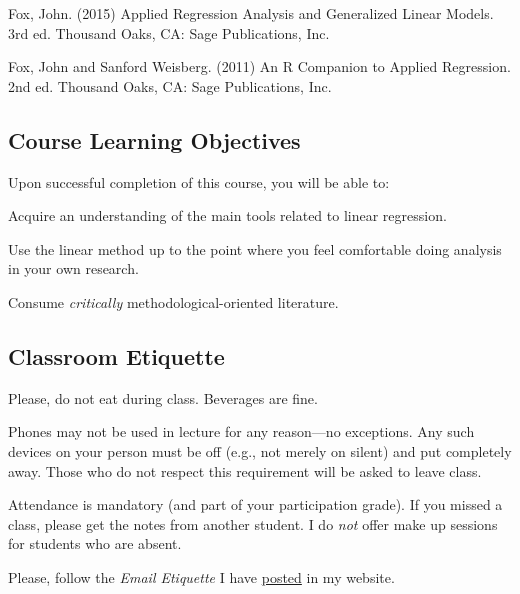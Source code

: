 \documentclass[letterpaper]{article}
\renewenvironment{itemize}{
  \begin{list}{}{
    \setlength{\leftmargin}{1.5em}
  }
}{
  \end{list}
}
\begin{document}
\begin{itemize}
	\item[$\bullet$] Fox, John. (2015) Applied Regression Analysis and Generalized Linear Models. 3rd ed. Thousand Oaks, CA: Sage Publications, Inc.
	\item[$\bullet$] Fox, John and Sanford Weisberg. (2011) An R Companion to Applied Regression. 2nd ed. Thousand Oaks, CA: Sage Publications, Inc.
\end{itemize}


\subsection*{Course Learning Objectives}
 
Upon successful completion of this course, you will be able to:

\begin{itemize}
	\item[$\bullet$] Acquire an understanding of the main tools related to linear regression.
	\item[$\bullet$] Use the linear method up to the point where you feel comfortable doing analysis in your own research.
	\item[$\bullet$] Consume \emph{critically} methodological-oriented literature.
\end{itemize}








\subsection*{Classroom Etiquette}
 

\begin{itemize}
	\item[$\bullet$] Please, do not eat during class. Beverages are fine.
	\item[$\bullet$] Phones may not be used in lecture for any reason---no exceptions. Any such devices on your person must be off (e.g., not merely on silent) and put completely away. Those who do not respect this requirement will be asked to leave class.
	\item[$\bullet$] Attendance is mandatory (and part of your participation grade). If you missed a class, please get the notes from another student. I do \emph{not} offer make up sessions for students who are absent.
	\item[$\bullet$] Please, follow the \emph{Email Etiquette} I have \href{http://www.hectorbahamonde.com/resources/}{posted} in my website.
\end{itemize}
\end{document}
